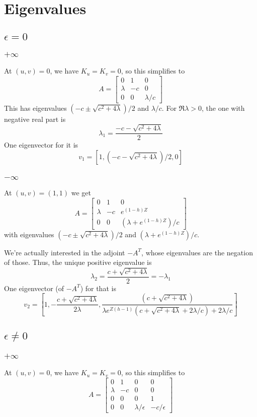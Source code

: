 \documentclass[10pt]{article}
\begin{document}
\section{Eigenvalues}
\subsection{$\epsilon = 0$}
\subsubsection{$+\infty$}
At $(u,v) = 0$, we have $K_u = K_v = 0$, so this simplifies to
\[
A = \begin{bmatrix}
0 & 1 & 0 \\
\lambda &  -c  &  0 \\
0 &  0  &  \lambda/c
\end{bmatrix}
\]
This has eigenvalues $(-c \pm \sqrt{c^2 + 4 \lambda})/2$ and $\lambda/c$.  For $\Re \lambda > 0$, the one with negative real part is
\[\lambda_1 = \frac{-c - \sqrt{c^2 + 4 \lambda}}{2}\]
One eigenvector for it is
\[v_1 = [1,(-c - \sqrt{c^2 + 4 \lambda})/2,0] \]

\subsubsection{$-\infty$}
At $(u,v) = (1,1)$ we get
\[
A = \begin{bmatrix}
0 & 1 & 0 \\
\lambda &  -c  &  e^{(1-h)Z} \\
0 &  0  &  (\lambda + e^{(1-h)Z})/c
\end{bmatrix}
\]
with eigenvalues $(-c \pm \sqrt{c^2 + 4 \lambda})/2$ and $(\lambda + e^{(1-h)Z})/c$.

We're actually interested in the adjoint $-A^T$, whose eigenvalues are the negation of those.
Thus, the unique positive eigenvalue is
\[\lambda_2 = \frac{c + \sqrt{c^2 + 4 \lambda}}{2} = -\lambda_1 \]
One eigenvector (of $-A^T$) for that is
\[
v_2 = \left[1, -\frac{c + \sqrt{c^2 + 4 \lambda}}{2\lambda}, \frac{(c + \sqrt{c^2+4\lambda})}{\lambda e^{Z(h-1)}(c + \sqrt{c^2+4\lambda} + 2 \lambda/c)+ 2 \lambda / c}\right]
\]

\subsection{$\epsilon \neq 0$}
\subsubsection{$+\infty$}
At $(u,v) = 0$, we have $K_u = K_v = 0$, so this simplifies to
\[
A = \begin{bmatrix}
0 & 1 & 0 & 0 \\
\lambda &  -c  &  0  & 0 \\
0 & 0 & 0 & 1 \\
0 &  0  &  \lambda /\epsilon  &  - c / \epsilon
\end{bmatrix}
\]
\end{document}
